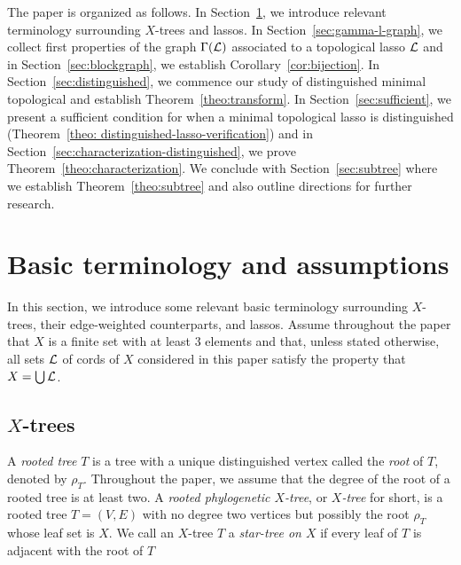 
The paper is organized as follows. In Section~\ref{sec:terminology},
we introduce relevant terminology surrounding $X$-trees and
lassos. In Section~\ref{sec:gamma-l-graph}, we 
collect first properties of the graph $\Gamma({\mathcal L})$ associated
to a topological lasso ${\mathcal L}$ and in Section~\ref{sec:blockgraph}, we 
establish Corollary~\ref{cor:bijection}. In Section~\ref{sec:distinguished}, 
we commence our study of distinguished minimal topological
and establish Theorem~\ref{theo:transform}. In Section~\ref{sec:sufficient},
we present a sufficient condition for when a 
minimal topological lasso is distinguished 
(Theorem~\ref{theo: distinguished-lasso-verification}) and in
Section~\ref{sec:characterization-distinguished}, we 
prove Theorem~\ref{theo:characterization}. We conclude with
Section~\ref{sec:subtree} where we establish Theorem~\ref{theo:subtree}
and also outline directions for further research.


\section{Basic terminology and assumptions}\label{sec:terminology}
In this section, we introduce some relevant 
basic terminology surrounding $X$-trees,
their edge-weighted counterparts, and lassos.  Assume throughout the paper  
that $X$ is a finite set with at least 3 elements and that, unless
stated otherwise, all sets ${\mathcal L}$ of
cords of $X$ considered in this paper 
satisfy the property  that
$X=\bigcup {\mathcal L}$. 


\subsection{$X$-trees}
A {\em rooted tree} $T$ is a tree with a unique distinguished vertex 
called the
{\em root} of $T$, denoted by $\rho_T$. Throughout the paper, we 
assume that the degree of the root of a rooted tree is at least two.
A {\em rooted phylogenetic $X$-tree}, or {\em $X$-tree} for short, 
is a rooted tree $T=(V,E)$ with no degree two vertices but
possibly the root $\rho_T$ whose leaf set is $X$. We call 
an $X$-tree $T$ a {\em star-tree
on $X$} if every leaf of $T$ is adjacent with the root  of $T$ 

